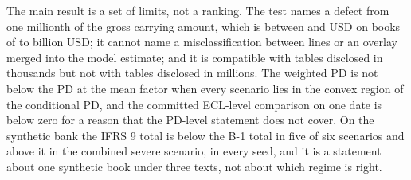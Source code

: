 The main result is a set of limits, not a ranking.
The test names a defect from one millionth of the gross carrying amount, which is between \eoneCleanLimitLow{} and \eoneCleanLimitHigh{} USD on books of \eoneGrossLow{} to \eoneGrossHigh{} billion USD; it cannot name a misclassification between lines or an overlay merged into the model estimate; and it is compatible with tables disclosed in thousands but not with tables disclosed in millions.
The weighted PD is not below the PD at the mean factor when every scenario lies in the convex region of the conditional PD, and the committed ECL-level comparison on one date is below zero for a reason that the PD-level statement does not cover.
On the synthetic bank the IFRS 9 total is below the B-1 total in five of six scenarios and above it in the combined severe scenario, in every seed, and it is a statement about one synthetic book under three texts, not about which regime is right.
